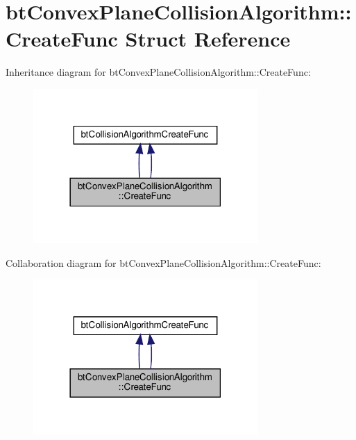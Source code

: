 \hypertarget{structbtConvexPlaneCollisionAlgorithm_1_1CreateFunc}{}\section{bt\+Convex\+Plane\+Collision\+Algorithm\+:\+:Create\+Func Struct Reference}
\label{structbtConvexPlaneCollisionAlgorithm_1_1CreateFunc}


Inheritance diagram for bt\+Convex\+Plane\+Collision\+Algorithm\+:\+:Create\+Func\+:
\nopagebreak
\begin{figure}[H]
\begin{center}
\leavevmode
\includegraphics[width=242pt]{structbtConvexPlaneCollisionAlgorithm_1_1CreateFunc__inherit__graph}
\end{center}
\end{figure}


Collaboration diagram for bt\+Convex\+Plane\+Collision\+Algorithm\+:\+:Create\+Func\+:
\nopagebreak
\begin{figure}[H]
\begin{center}
\leavevmode
\includegraphics[width=242pt]{structbtConvexPlaneCollisionAlgorithm_1_1CreateFunc__coll__graph}
\end{center}
\end{figure}
